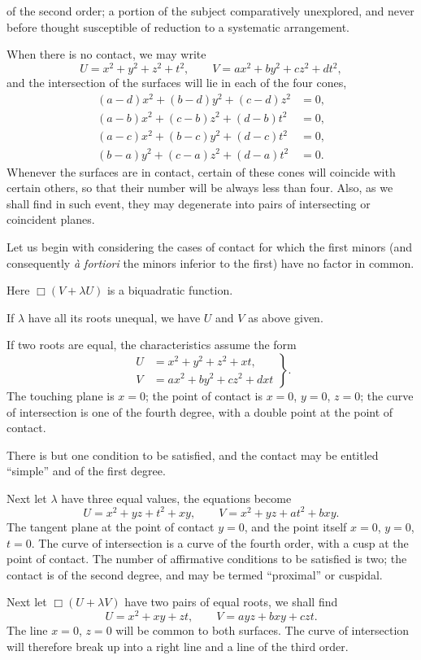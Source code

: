 \documentclass[11pt]{article}
\newcommand{\sourcepage}[1]{\marginpar{\scriptsize p.~#1}}
\begin{document}
{{\sourcepage{227}
of the second order; a portion of the subject comparatively unexplored, and never before thought susceptible of reduction to a systematic arrangement.

When there is no contact, we may write
\[
U=x^2+y^2+z^2+t^2,
\qquad
V=ax^2+by^2+cz^2+dt^2,
\]
and the intersection of the surfaces will lie in each of the four cones,
\[
\begin{aligned}
(a-d)x^2+(b-d)y^2+(c-d)z^2&=0,\\
(a-b)x^2+(c-b)z^2+(d-b)t^2&=0,\\
(a-c)x^2+(b-c)y^2+(d-c)t^2&=0,\\
(b-a)y^2+(c-a)z^2+(d-a)t^2&=0.
\end{aligned}
\]
Whenever the surfaces are in contact, certain of these cones will coincide with certain others, so that their number will be always less than four. Also, as we shall find in such event, they may degenerate into pairs of intersecting or coincident planes.

Let us begin with considering the cases of contact for which the first minors (and consequently \emph{à fortiori} the minors inferior to the first) have no factor in common.

Here $\Box(V+\lambda U)$ is a biquadratic function.

If $\lambda$ have all its roots unequal, we have $U$ and $V$ as above given.

If two roots are equal, the characteristics assume the form
\[
\left.\begin{aligned}
U&=x^2+y^2+z^2+xt,\\
V&=ax^2+by^2+cz^2+dxt
\end{aligned}\right\}.
\]
The touching plane is $x=0$; the point of contact is $x=0$, $y=0$, $z=0$; the curve of intersection is one of the fourth degree, with a double point at the point of contact.

There is but one condition to be satisfied, and the contact may be entitled ``simple'' and of the first degree.

Next let $\lambda$ have three equal values, the equations become
\[
U=x^2+yz+t^2+xy,
\qquad
V=x^2+yz+at^2+bxy.
\]
The tangent plane at the point of contact $y=0$, and the point itself $x=0$, $y=0$, $t=0$. The curve of intersection is a curve of the fourth order, with a cusp at the point of contact. The number of affirmative conditions to be satisfied is two; the contact is of the second degree, and may be termed ``proximal'' or cuspidal.

\sourcepage{228}
Next let $\Box(U+\lambda V)$ have two pairs of equal roots, we shall find
\[
U=x^2+xy+zt,
\qquad
V=ayz+bxy+czt.
\]
The line $x=0$, $z=0$ will be common to both surfaces. The curve of intersection will therefore break up into a right line and a line of the third order.

}}
\end{document}
